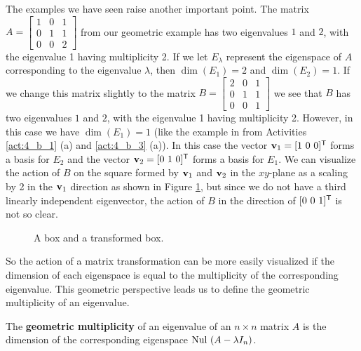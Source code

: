 The examples we have seen raise another important point. The matrix $A = \left[ \begin{array}{ccc} 1&0&1\\0&1&1\\0&0&2 \end{array} \right]$ from our geometric example has two eigenvalues $1$ and $2$, with the eigenvalue 1 having multiplicity 2. If we let $E_{\lambda}$ represent the eigenspace of $A$ corresponding to the eigenvalue $\lambda$, then $\dim(E_1)=2$ and $\dim(E_2) = 1$. If we change this matrix slightly to the matrix $B = \left[ \begin{array}{crc} 2&0&1 \\ 0&1&1 \\ 0&0&1 \end{array} \right]$ we see that $B$ has two eigenvalues $1$ and $2$, with the eigenvalue 1 having multiplicity 2. However, in this case we have $\dim(E_1) = 1$ (like the example in from Activities \ref{act:4_b_1} (a) and \ref{act:4_b_3} (a)). In this case the vector $\mathbf{v}_1 = [1 \ 0 \ 0]^{\mathsf{T}}$ forms a basis for $E_2$ and the vector $\vv_2 = [0 \ 1 \ 0]^{\tr}$ forms a basis for $E_1$. We can visualize the action of $B$ on the square formed by $\mathbf{v}_1$ and $\mathbf{v}_2$ in the $xy$-plane as a scaling by 2 in the $\mathbf{v}_1$ direction as shown in Figure \ref{F:4_b_2}, but since we do not have a third linearly independent eigenvector, the action of $B$ in the direction of $[0 \ 0 \ 1]^{\mathsf{T}}$ is not so clear. 
\begin{figure}[ht]
\begin{center}
\end{center}
\caption{A box and a transformed box.}
\label{F:4_b_2}
\end{figure}

So the action of a matrix transformation can be more easily visualized if the dimension of each eigenspace is equal to the multiplicity of the corresponding eigenvalue. This geometric perspective leads us to define the geometric multiplicity of an eigenvalue.



\begin{definition} The \textbf{geometric multiplicity} of an eigenvalue of an $n \times n$ matrix $A$ is the dimension of the corresponding eigenspace $\text{Nul } (A-\lambda I_n)$. 
\end{definition}

